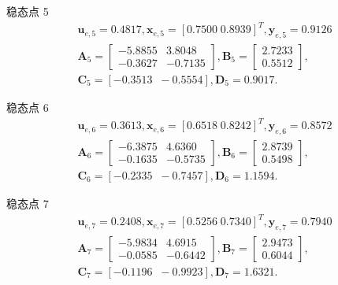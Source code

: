 \documentclass{article}
\begin{document}
稳态点 5
\begin{equation}
\begin{matrix}
\bm{u}_{e,5}=0.4817,\bm{x}_{e,5}=[0.7500\;0.8939]^{T},\bm{y}_{e,5} = 0.9126\\
\mathbf{A}_5=
\begin{bmatrix}
-5.8855 & 3.8048\\
-0.3627 & -0.7135
\end{bmatrix},
\mathbf{B}_5=
\begin{bmatrix}
 2.7233 \\
 0.5512
\end{bmatrix},\\
\mathbf{C}_5 = [-0.3513\;\;-0.5554],\mathbf{D}_5 = 0.9017.
\end{matrix}
\end{equation}

稳态点 6
\begin{equation}
\begin{matrix}
\bm{u}_{e,6}=0.3613,\bm{x}_{e,6}=[0.6518\;0.8242]^{T},\bm{y}_{e,6} = 0.8572\\
\mathbf{A}_6=
\begin{bmatrix}
-6.3875 & 4.6360\\
-0.1635 & -0.5735
\end{bmatrix},
\mathbf{B}_6=
\begin{bmatrix}
 2.8739 \\
 0.5498
\end{bmatrix},\\
\mathbf{C}_6 = [-0.2335\;\;-0.7457],\mathbf{D}_6 = 1.1594.
\end{matrix}
\end{equation}

稳态点 7
\begin{equation}
\begin{matrix}
\bm{u}_{e,7}=0.2408,\bm{x}_{e,7}=[0.5256\;0.7340]^{T},\bm{y}_{e,7} = 0.7940\\
\mathbf{A}_7=
\begin{bmatrix}
-5.9834 & 4.6915\\
-0.0585 & -0.6442
\end{bmatrix},
\mathbf{B}_7=
\begin{bmatrix}
 2.9473 \\
 0.6044
\end{bmatrix},\\
\mathbf{C}_7 = [-0.1196\;\;-0.9923],\mathbf{D}_7 = 1.6321.
\end{matrix}
\end{equation}
\end{document}
